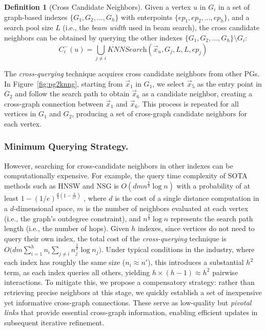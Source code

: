 \documentclass[acmsmall]{acmart}
\theoremstyle{remark}
\theoremstyle{definition}
\newtheorem{definition}{\bf Definition}
\begin{document}
\begin{definition}[Cross Candidate Neighbors] Given a vertex $u$ in $G_i$ in a set of graph-based indexes $\{G_1, G_2, \ldots, G_h\}$ with enterpoints $\{ep_1, ep_2, \ldots, ep_h\}$, and a search pool size $L$ (i.e., the \textit{beam width} used in beam search), the cross candidate neighbors can be obtained by querying the other indexes $\{G_1, G_2, \ldots, G_h\} \setminus G_i$:
	\begin{equation}
		C_{i}^{-}(u) = \bigcup_{j \ne i} \textit{KNNSearch}(\vec{x}_u, G_j, L, L, ep_j)
	\end{equation}
\end{definition}

The \textit{cross-querying} technique acquires cross candidate neighbors from other PGs. In Figure~\ref{fig:pg2knng}, starting from $\vec{x}_1$ in $G_1$, we select $\vec{x}_5$ as the entry point in $G_2$ and follow the search path to obtain $\vec{x}_6$ as a candidate neighbor, creating a cross-graph connection between $\vec{x}_1$ and $\vec{x}_6$. This process is repeated for all vertices in $G_1$ and $G_2$, producing a set of cross-graph candidate neighbors for each vertex.

\subsubsection{Minimum Querying Strategy.}\label{subsubsec:min_querying} However, searching for cross-candidate neighbors in other indexes can be computationally expensive.  For example, the query time complexity of SOTA methods such as HNSW and NSG is $O(d m n^{\frac{2}{d}}\log n)$ with a probability of at least $1 - (1/e)^{\frac{d}{4}(1-\frac{3}{e^2})}$ \cite{wang2021comprehensive,fu2017fast,peng2023efficient}, where $d$ is the cost of a single distance computation in a $d$-dimensional space, $m$ is the number of neighbors evaluated at each vertex (i.e., the graph's outdegree constraint), and $n^{\frac{2}{d}}\log n$ represents the search path length (i.e., the number of hops). Given $h$ indexes, since vertices do not need to query their own index, the total cost of the \textit{cross-querying} technique is $O\big(dm \sum_{i=1}^{h} n_i \sum_{j \neq i} n_{j}^{\frac{2}{d}} \log n_j\big)$. Under typical conditions in the industry, where each index has roughly the same size ($n_i \approx n'$), this introduces a substantial $h^2$ term, as each index queries all others, yielding $h \times (h-1) \approx h^2$ pairwise interactions. To mitigate this, we propose a compensatory strategy: rather than retrieving precise neighbors at this stage, we quickly establish a set of inexpensive yet informative cross-graph connections. These serve as low-quality but \textit{pivotal links} that provide essential cross-graph information, enabling efficient updates in subsequent iterative refinement.
\end{document}
